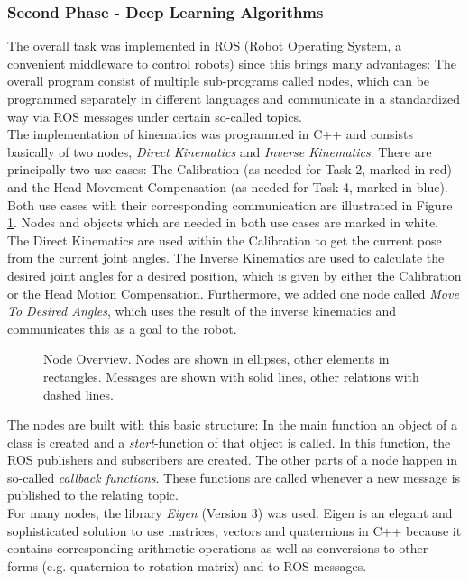 \documentclass[conference]{IEEEtran}
\begin{document}
\subsubsection{Second Phase - Deep Learning Algorithms}
The overall task was implemented in ROS (Robot Operating System, a convenient middleware to control robots) since this brings many advantages: The overall program consist of multiple sub-programs called nodes, which can be programmed separately in different languages and communicate in a standardized way via ROS messages under certain so-called topics.\\
The implementation of kinematics was programmed in C++ and consists basically of two nodes, \textit{Direct Kinematics} and \textit{Inverse Kinematics}. There are principally two use cases: The Calibration (as needed for Task 2, marked in red) and the Head Movement Compensation (as needed for Task 4, marked in blue). Both use cases with their corresponding communication are illustrated in Figure \ref{fig:Nodes}. Nodes and objects which are needed in both use cases are marked in white.  The Direct Kinematics are used within the Calibration to get the current pose from the current joint angles. The Inverse Kinematics are used to calculate the desired joint angles for a desired position, which is given by either the Calibration or the Head Motion Compensation. Furthermore, we added one node called \textit{Move To Desired Angles}, which uses the result of the inverse kinematics and communicates this as a goal to the robot.\\
\begin{figure}[h]
	\centering
	\def\svgwidth{270pt}
	
	\caption{Node Overview. Nodes are shown in ellipses, other elements in rectangles. Messages are shown with solid lines, other relations with dashed lines.}
	\label{fig:Nodes}
\end{figure}
The nodes are built with this basic structure: In the main function an object of a class is created and a \textit{start}-function of that object is called. In this function, the ROS publishers and subscribers are created. The other parts of a node happen in so-called \textit{callback functions}. These functions are called whenever a new message is published to the relating topic.\\
For many nodes, the library \textit{Eigen} (Version 3) \cite{Eigen} was used. Eigen is an elegant and sophisticated solution to use matrices, vectors and quaternions in C++ because it contains corresponding arithmetic operations as well as conversions to other forms (e.g. quaternion to rotation matrix) and to ROS messages.
\end{document}
